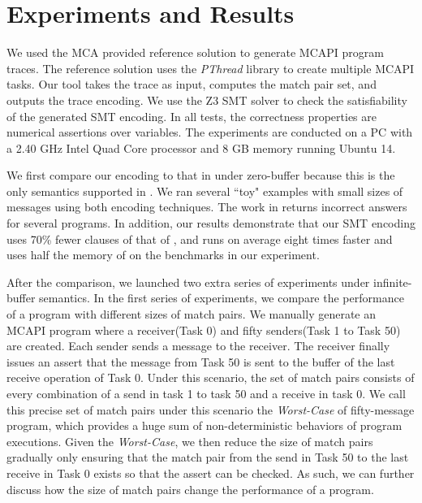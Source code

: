 \section{Experiments and Results}
We used the MCA provided reference solution to generate MCAPI program traces. The reference solution uses the \textit{PThread} library to create multiple MCAPI tasks. Our tool takes the trace as input, computes the match pair set, and outputs the trace encoding. We use the Z3 SMT solver \cite{demoura:tacas08} to check the satisfiability of the generated SMT encoding. In all tests, the correctness properties are numerical assertions over variables. The experiments are conducted on a PC with a 2.40 GHz Intel Quad Core processor and 8 GB memory running Ubuntu 14.

We first compare our encoding to that in \cite{elwakil:padtad10} under zero-buffer because this is the only semantics supported in \cite{elwakil:padtad10}. We ran several ``toy" examples with small sizes of messages using both encoding techniques. The work in \cite{elwakil:padtad10} returns incorrect answers for several programs. In addition, our results demonstrate that our SMT encoding uses 70\% fewer clauses of that of \cite{elwakil:padtad10}, and runs on average eight times faster and uses half the memory of \cite{elwakil:padtad10} on the benchmarks in our experiment.

After the comparison, we launched two extra series of experiments under infinite-buffer semantics. In the first series of experiments, we compare the performance of a program with different sizes of match pairs. We manually generate an MCAPI program where a receiver(Task 0) and fifty senders(Task 1 to Task 50) are created. Each sender sends a message to the receiver. The receiver finally issues an assert that the message from Task 50 is sent to the buffer of the last receive operation of Task 0. Under this scenario, the set of match pairs consists of every combination of a send in task 1 to task 50 and a receive in task 0. We call this precise set of match pairs under this scenario the \textit{Worst-Case} of fifty-message program, which provides a huge sum of non-deterministic behaviors of program executions. Given the \textit{Worst-Case}, we then reduce the size of match pairs gradually only ensuring that the match pair from the send in Task 50 to the last receive in Task 0 exists so that the assert can be checked. As such, we can further discuss how the size of match pairs change the performance of a program.

